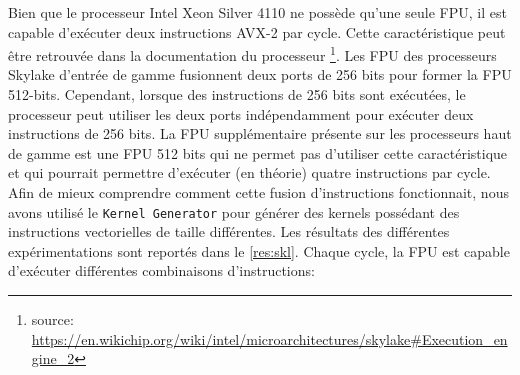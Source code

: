        
        
        
        \begin{table}[h!]
        \centering

        \caption{Mesure de la performance de processeur de deux gammes différentes à l'aide du \texttt{Kernel Generator} et de la commande suivante: \texttt{/kg  -P double -W 256 -O ffffffff}. Alors que le processeur de la gamme Gold possède une FPU de plus, il obtient des performances similaires à celles du processeur de gamme Silver.}
        \label{table:skl_bench2}
        \end{table}
        
        Bien que le processeur Intel Xeon Silver 4110 ne possède qu'une seule \gls{FPU}, il est capable d'exécuter deux instructions AVX-2 par cycle. Cette caractéristique peut être retrouvée dans la documentation du processeur \footnote{source: \url{https://en.wikichip.org/wiki/intel/microarchitectures/skylake\#Execution_engine_2}}. Les FPU des processeurs Skylake d'entrée de gamme fusionnent deux ports de 256 bits pour former la FPU 512-bits. Cependant, lorsque des instructions de 256 bits sont exécutées, le processeur peut utiliser les deux ports indépendamment pour exécuter deux instructions de 256 bits. La FPU supplémentaire présente sur les processeurs haut de gamme est une FPU 512 bits qui ne permet pas d'utiliser cette caractéristique et qui pourrait permettre d'exécuter (en théorie) quatre instructions par cycle.
        Afin de mieux comprendre comment cette fusion d'instructions fonctionnait, nous avons utilisé le \verb|Kernel Generator| pour générer des \glspl{kernel} possédant des instructions vectorielles de taille différentes. Les résultats des différentes expérimentations sont reportés dans le \autoref{res:skl}. Chaque cycle, la FPU est capable d'exécuter différentes combinaisons d'instructions: 


